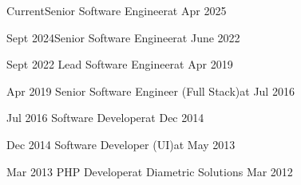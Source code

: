%
%
%
\twocolumnsection
{\begin{experienceshalf}
    \experiencenew
    {Current}{Senior Software Engineer}{at {}}
    {Apr 2025}

    \experiencenew
    {Sept 2024}{Senior Software Engineer}{at {}}
    {June 2022}

    \experiencenew
    {Sept 2022}     {Lead Software Engineer}{at {}}
    {Apr 2019}

    \experiencenewlast
    {Apr 2019}     {Senior Software Engineer (Full Stack)}{at {}}
    {Jul 2016}
\end{experienceshalf}}
{\begin{experienceshalf}
    \experiencenew
    {Jul 2016}     {Software Developer}{at {}}
    {Dec 2014}

    \experiencenew
    {Dec 2014}     {Software Developer (UI)}{at {}}
    {May 2013}

    \experiencenewlast
    {Mar 2013}     {PHP Developer}{at Diametric Solutions}
    {Mar 2012}
\end{experienceshalf}}